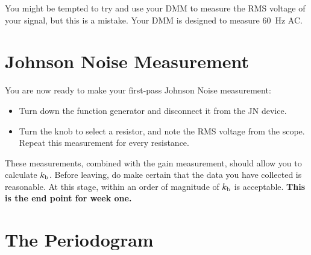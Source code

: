 \documentclass[12pt]{article}
\newcommand{\kb}{k_{\rm b}}
\begin{document}
You might be tempted to try and use your DMM to measure the RMS voltage of your signal, but this is a mistake.  Your DMM is designed to measure 60~\rm Hz AC.

\section{Johnson Noise Measurement}
You are now ready to make your first-pass Johnson Noise measurement:
\begin{itemize}
\item Turn down the function generator and disconnect it from the JN device.

\item Turn the knob to select a resistor, and note the RMS voltage from the scope.  Repeat this measurement for every resistance.  
\end{itemize}

These measurements, combined with the gain measurement, should allow you to calculate $\kb$.
Before leaving, do make certain that the data you have collected is reasonable.  At this stage, within an order of magnitude of $\kb$ is acceptable.  {\bf This is the end point for week one.}  

\section{The Periodogram}
\end{document}
